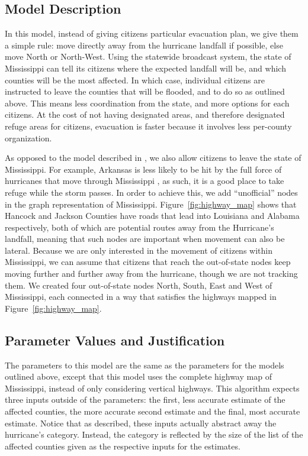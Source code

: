 \documentclass[titlepage]{article}
\begin{document}
  \subsection{Model Description}
    \par In this model, instead of giving citizens particular evacuation plan, we give them a simple rule: move directly away from the hurricane landfall if possible, else move North or North-West. Using the statewide broadcast system, the state of Mississippi can tell its citizens where the expected landfall will be, and which counties will be the most affected. In which case, individual citizens are instructed to leave the counties that will be flooded, and to do so as outlined above. This means less coordination from the state, and more options for each citizens. At the cost of not having designated areas, and therefore designated refuge areas for citizens, evacuation is faster because it involves less per-county organization.\\
    \par As opposed to the model described in , we also allow citizens to leave the state of Mississippi. For example, Arkansas is less likely to be hit by the full force of hurricanes that move through Mississippi \cite{5news}, as such, it is a good place to take refuge while the storm passes. In order to achieve this, we add ``unofficial'' nodes in the graph representation of Mississippi. Figure~\ref{fig:highway_map} shows that Hancock and Jackson Counties have roads that lead into Louisiana and Alabama respectively, both of which are potential routes away from the Hurricane's landfall, meaning that such nodes are important when movement can also be lateral. Because we are only interested in the movement of citizens within Mississippi, we can assume that citizens that reach the out-of-state nodes keep moving further and further away from the hurricane, though we are not tracking them. We created four out-of-state nodes North, South, East and West of Mississippi, each connected in a way that satisfies the highways mapped in Figure~\ref{fig:highway_map}.
  \subsection{Parameter Values and Justification}
    \par The parameters to this model are the same as the parameters for the models outlined above, except that this model uses the complete highway map of Mississippi, instead of only considering vertical highways. This algorithm expects three inputs outside of the parameters: the first, less accurate estimate of the affected counties, the more accurate second estimate and the final, most accurate estimate. Notice that as described, these inputs actually abstract away the hurricane's category. Instead, the category is reflected by the size of the list of the affected counties given as the respective inputs for the estimates.
\end{document}
